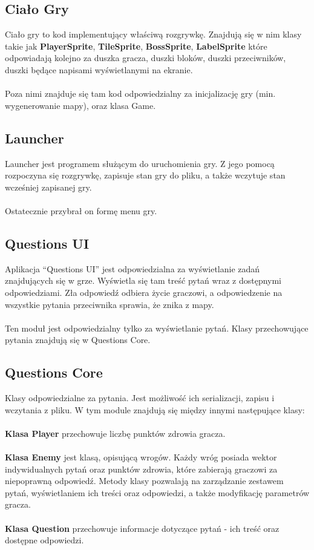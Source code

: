 \documentclass[12pt, titlepage]{article}
\begin{document}
\subsection{Ciało Gry}
Ciało gry to kod implementujący właściwą
rozgrywkę. Znajdują się w nim klasy takie
jak \textbf{PlayerSprite}, \textbf{TileSprite},
\textbf{BossSprite}, \textbf{LabelSprite}
które odpowiadają kolejno
za duszka gracza, duszki bloków,
duszki przeciwników, duszki będące napisami
wyświetlanymi na ekranie.
\\~\\
Poza nimi znajduje się tam kod odpowiedzialny
za inicjalizację gry (min. wygenerowanie mapy),
oraz klasa Game.

\subsection{Launcher}
Launcher jest programem
służącym do uruchomienia gry.
Z jego pomocą rozpoczyna się
rozgrywkę, zapisuje stan gry
do pliku, a także wczytuje stan 
wcześniej zapisanej gry.
\\~\\
Ostatecznie przybrał on formę
menu gry.

\subsection{Questions UI}
Aplikacja "`Questions UI"'
jest odpowiedzialna za
wyświetlanie zadań znajdujących
się w grze.
Wyświetla się tam treść pytań
wraz z dostępnymi odpowiedziami.
Zła odpowiedź odbiera
życie graczowi, a odpowiedzenie
na wszystkie pytania przeciwnika
sprawia, że znika z mapy.
\\~\\
Ten moduł jest odpowiedzialny
tylko za wyświetlanie pytań.
Klasy przechowujące pytania znajdują
się w Questions Core.

\subsection{Questions Core}
Klasy odpowiedzialne za pytania.
Jest możliwość ich serializacji,
zapisu i wczytania z pliku.
W tym module znajdują się między
innymi następujące klasy:
\\~\\
\textbf{Klasa Player} przechowuje
liczbę punktów zdrowia gracza.
\\~\\
\textbf{Klasa Enemy} jest klasą,
opisującą wrogów. Każdy wróg posiada 
wektor indywidualnych pytań oraz
punktów zdrowia, które zabierają
graczowi za niepoprawną
odpowiedź. Metody klasy
pozwalają na zarządzanie zestawem
pytań, wyświetlaniem ich treści
oraz odpowiedzi, a także 
modyfikację parametrów gracza.
\\~\\
\textbf{Klasa Question} przechowuje
informacje dotyczące pytań - ich
treść oraz dostępne odpowiedzi.
\end{document}
